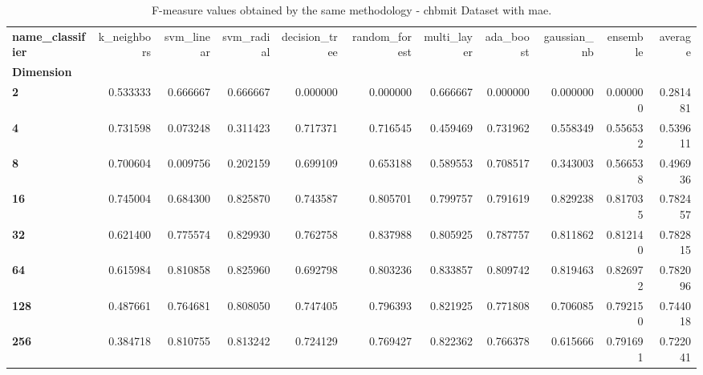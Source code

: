 \begin{table}
\centering
\caption{F-measure values obtained by the same methodology - chbmit Dataset with mae.}
\label{f-measure_chbmit_mae-reproduction}
\begin{tabular}{lrrrrrrrrrr}
\toprule
\textbf{name\_classifier} &  k\_neighbors &  svm\_linear &  svm\_radial &  decision\_tree &  random\_forest &  multi\_layer &  ada\_boost &  gaussian\_nb &  ensemble &   average \\
\textbf{Dimension} &              &             &             &                &                &              &            &              &           &           \\
\midrule
\textbf{2        } &     0.533333 &    0.666667 &    0.666667 &       0.000000 &       0.000000 &     0.666667 &   0.000000 &     0.000000 &  0.000000 &  0.281481 \\
\textbf{4        } &     0.731598 &    0.073248 &    0.311423 &       0.717371 &       0.716545 &     0.459469 &   0.731962 &     0.558349 &  0.556532 &  0.539611 \\
\textbf{8        } &     0.700604 &    0.009756 &    0.202159 &       0.699109 &       0.653188 &     0.589553 &   0.708517 &     0.343003 &  0.566538 &  0.496936 \\
\textbf{16       } &     0.745004 &    0.684300 &    0.825870 &       0.743587 &       0.805701 &     0.799757 &   0.791619 &     0.829238 &  0.817035 &  0.782457 \\
\textbf{32       } &     0.621400 &    0.775574 &    0.829930 &       0.762758 &       0.837988 &     0.805925 &   0.787757 &     0.811862 &  0.812140 &  0.782815 \\
\textbf{64       } &     0.615984 &    0.810858 &    0.825960 &       0.692798 &       0.803236 &     0.833857 &   0.809742 &     0.819463 &  0.826972 &  0.782096 \\
\textbf{128      } &     0.487661 &    0.764681 &    0.808050 &       0.747405 &       0.796393 &     0.821925 &   0.771808 &     0.706085 &  0.792150 &  0.744018 \\
\textbf{256      } &     0.384718 &    0.810755 &    0.813242 &       0.724129 &       0.769427 &     0.822362 &   0.766378 &     0.615666 &  0.791691 &  0.722041 \\
\bottomrule
\end{tabular}
\end{table}
